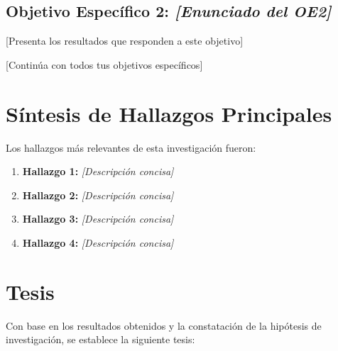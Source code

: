 \subsection{Objetivo Específico 2: \textit{{[Enunciado del OE2]}}}
\label{subsec:resultados_oe2}

{[Presenta los resultados que responden a este objetivo]}

{[Continúa con todos tus objetivos específicos]}

\section{Síntesis de Hallazgos Principales}
\label{sec:sintesis_hallazgos}

Los hallazgos más relevantes de esta investigación fueron:

\begin{enumerate}
    \item \textbf{Hallazgo 1:} \textit{{[Descripción concisa]}}
    \item \textbf{Hallazgo 2:} \textit{{[Descripción concisa]}}
    \item \textbf{Hallazgo 3:} \textit{{[Descripción concisa]}}
    \item \textbf{Hallazgo 4:} \textit{{[Descripción concisa]}}
\end{enumerate}

\section{Tesis}
\label{sec:tesis}


Con base en los resultados obtenidos y la constatación de la hipótesis de investigación, se establece la siguiente tesis:

\begin{center}
\end{center}

